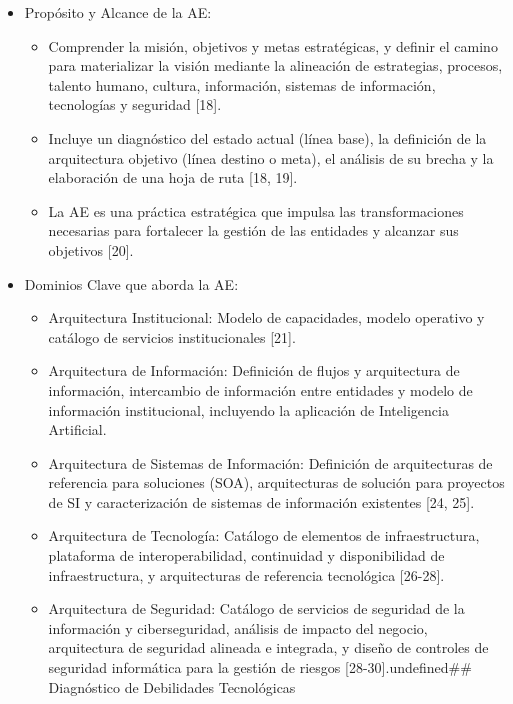 \documentclass[
	a4paper, %
	12pt, %
]{include/CSSullivanBusinessReport}
\def\tightlist{}
\begin{document}
\begin{itemize}
\tightlist
\item
  Propósito y Alcance de la AE:

  \begin{itemize}
  \tightlist
  \item
    Comprender la misión, objetivos y metas estratégicas, y definir el
    camino para materializar la visión mediante la alineación de
    estrategias, procesos, talento humano, cultura, información,
    sistemas de información, tecnologías y seguridad {[}18{]}.
  \item
    Incluye un diagnóstico del estado actual (línea base), la definición
    de la arquitectura objetivo (línea destino o meta), el análisis de
    su brecha y la elaboración de una hoja de ruta {[}18, 19{]}.
  \item
    La AE es una práctica estratégica que impulsa las transformaciones
    necesarias para fortalecer la gestión de las entidades y alcanzar
    sus objetivos {[}20{]}.
  \end{itemize}
\item
  Dominios Clave que aborda la AE:

  \begin{itemize}
  \tightlist
  \item
    Arquitectura Institucional: Modelo de capacidades, modelo operativo
    y catálogo de servicios institucionales {[}21{]}.
  \item
    Arquitectura de Información: Definición de flujos y arquitectura de
    información, intercambio de información entre entidades y modelo de
    información institucional, incluyendo la aplicación de Inteligencia
    Artificial.
  \item
    Arquitectura de Sistemas de Información: Definición de arquitecturas
    de referencia para soluciones (SOA), arquitecturas de solución para
    proyectos de SI y caracterización de sistemas de información
    existentes {[}24, 25{]}.
  \item
    Arquitectura de Tecnología: Catálogo de elementos de
    infraestructura, plataforma de interoperabilidad, continuidad y
    disponibilidad de infraestructura, y arquitecturas de referencia
    tecnológica {[}26-28{]}.
  \item
    Arquitectura de Seguridad: Catálogo de servicios de seguridad de la
    información y ciberseguridad, análisis de impacto del negocio,
    arquitectura de seguridad alineada e integrada, y diseño de
    controles de seguridad informática para la gestión de riesgos
    {[}28-30{]}.undefined\#\# Diagnóstico de Debilidades Tecnológicas
  \end{itemize}
\end{itemize}
\end{document}
